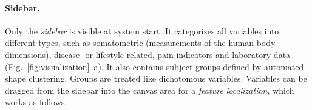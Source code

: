 \documentclass[journal]{style/vgtc} 			          %
\begin{document}
\paragraph{Sidebar.}
Only the \emph{sidebar} is visible at system start.
%
It categorizes all variables into different types, such as somatometric (measurements of the human body dimensions), disease- or lifestyle-related, pain indicators and laboratory data (Fig.~\ref{fig:visualization}~a).
%
It also contains subject groups defined by automated shape clustering.
%
Groups are treated like dichotomous variables. %
%
Variables can be dragged from the sidebar into the canvas area for a \emph{feature localization}, which works as follows.
%
\end{document}
